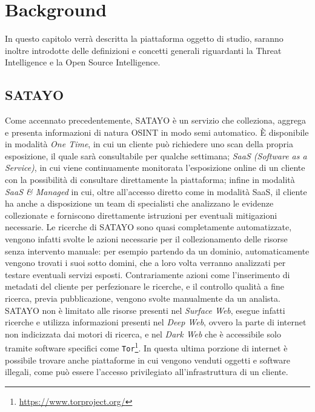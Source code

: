 \chapter{Background}
\label{cha:background}

In questo capitolo verrà descritta la piattaforma oggetto di studio, saranno inoltre
introdotte delle definizioni e concetti generali riguardanti la Threat Intelligence
e la Open Source Intelligence.

\section[SATAYO]{SATAYO\cite{satayo}}
\label{sec:satayo}

Come accennato precedentemente, SATAYO è un servizio che colleziona, aggrega e
presenta informazioni di natura OSINT in modo semi automatico. È disponibile in modalità
\textit{One Time}, in cui un cliente può richiedere uno scan della propria esposizione,
il quale sarà consultabile per qualche settimana; \textit{SaaS (Software as a Service)},
in cui viene continuamente monitorata l'esposizione online di un cliente con la possibilità
di consultare direttamente la piattaforma; infine in modalità \textit{SaaS \&
Managed} in cui, oltre all'accesso diretto come in modalità SaaS, il cliente ha anche
a disposizione un team di specialisti che analizzano le evidenze collezionate e forniscono
direttamente istruzioni per eventuali mitigazioni necessarie. Le ricerche di
SATAYO sono quasi completamente automatizzate, vengono infatti svolte le azioni necessarie
per il collezionamento delle risorse senza intervento manuale: per esempio
partendo da un dominio, automaticamente vengono trovati i suoi sotto domini, che
a loro volta verranno analizzati per testare eventuali servizi esposti. Contrariamente
azioni come l'inserimento di metadati del cliente per perfezionare le ricerche,
e il controllo qualità a fine ricerca, previa pubblicazione, vengono svolte
manualmente da un analista. SATAYO non è limitato alle risorse presenti nel \textit{Surface
Web}\cite{Kavallieros2021}, esegue infatti ricerche e utilizza informazioni
presenti nel \textit{Deep Web}, ovvero la parte di internet non indicizzata dai
motori di ricerca, e nel \textit{Dark Web} che è accessibile solo tramite
software specifici come \texttt{Tor}\footnote{\url{https://www.torproject.org/}}.
In questa ultima porzione di internet è possibile trovare anche piattaforme in cui
vengono venduti oggetti e software illegali, come può essere l'accesso
privilegiato all'infrastruttura di un cliente.

